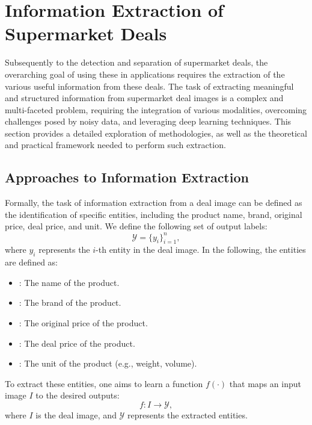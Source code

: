 \documentclass[11pt]{article}
\begin{document}
\section{Information Extraction of Supermarket Deals}
\label{sec:information_extraction}
Subsequently to the detection and separation of supermarket deals, the overarching goal of using these in applications requires the extraction of the various useful information from these deals. 
The task of extracting meaningful and structured information from supermarket deal images is a complex and multi-faceted problem, requiring the integration of various modalities, overcoming challenges posed by noisy data, and leveraging deep learning techniques. This section provides a detailed exploration of methodologies, as well as the theoretical and practical framework needed to perform such extraction.

\subsection{Approaches to Information Extraction}
Formally, the task of information extraction from a deal image can be defined as the identification of specific entities, including the product name, brand, original price, deal price, and unit. We define the following set of output labels:
\begin{equation}
\mathcal{Y} = \{y_{i}\}_{i=1}^{n},
\end{equation}
where $y_{i}$ represents the $i$-th entity in the deal image. In the following, the entities are defined as:
\begin{itemize}
    \item {}: The name of the product.
    \item {}: The brand of the product.
    \item {}: The original price of the product.
    \item {}: The deal price of the product.
    \item {}: The unit of the product (e.g., weight, volume).
\end{itemize}

To extract these entities, one aims to learn a function $f(\cdot)$ that maps an input image $I$ to the desired outputs:
\begin{equation}
    f: I \to \mathcal{Y},
\end{equation}
where $ I $ is the deal image, and $ \mathcal{Y} $ represents the extracted entities.
\end{document}
